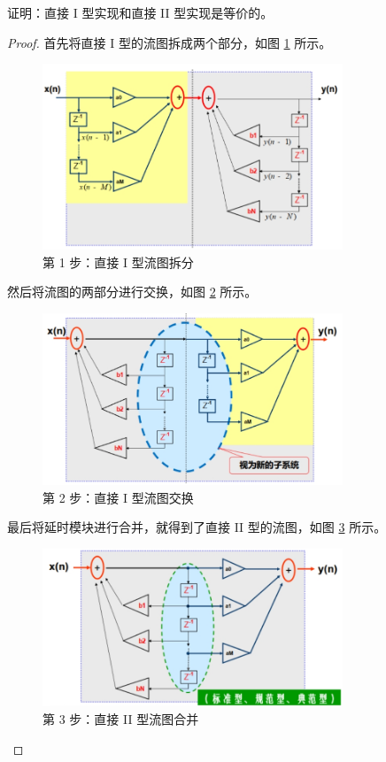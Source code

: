\begin{exercise}
    证明：直接 I 型实现和直接 II 型实现是等价的。
\end{exercise}

\begin{proof}
    首先将直接 I 型的流图拆成两个部分，如图 \ref{fig:iir-equivalence-step1} 所示。
    \begin{figure}[H]
        \centering
        \includegraphics[width=0.8\textwidth]{chap4/img/iir_equivalence_step1.png}
        \caption{第 1 步：直接 I 型流图拆分}
        \label{fig:iir-equivalence-step1}
    \end{figure}
    然后将流图的两部分进行交换，如图 \ref{fig:iir-equivalence-step2} 所示。
    \begin{figure}[H]
        \centering
        \includegraphics[width=0.8\textwidth]{chap4/img/iir_equivalence_step2.png}
        \caption{第 2 步：直接 I 型流图交换}
        \label{fig:iir-equivalence-step2}
    \end{figure}
    最后将延时模块进行合并，就得到了直接 II 型的流图，如图 \ref{fig:iir-equivalence-step3} 所示。
    \begin{figure}[H]
        \centering
        \includegraphics[width=0.8\textwidth]{chap4/img/iir_equivalence_step3.png}
        \caption{第 3 步：直接 II 型流图合并}
        \label{fig:iir-equivalence-step3}
    \end{figure}


\end{proof}
